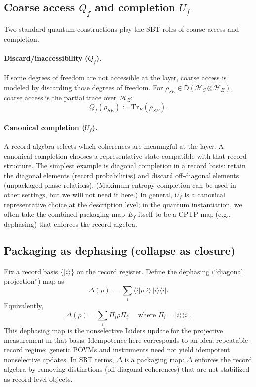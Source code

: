 \subsection{Coarse access $Q_f$ and completion $U_f$}

Two standard quantum constructions play the SBT roles of coarse access and completion.

\paragraph{Discard/inaccessibility ($Q_f$).}
If some degrees of freedom are not accessible at the layer, coarse access is modeled by discarding those degrees of freedom.
For $\rho_{SE}\in \mathsf{D}(\mathcal{H}_S\otimes \mathcal{H}_E)$, coarse access is the partial trace over~$\mathcal{H}_E$:
\[
Q_f(\rho_{SE}) := \mathrm{Tr}_E(\rho_{SE}).
\]

\paragraph{Canonical completion ($U_f$).}
A record algebra selects which coherences are meaningful at the layer.
A canonical completion chooses a representative state compatible with that record structure.
The simplest example is diagonal completion in a record basis: retain the diagonal elements (record probabilities) and discard off-diagonal elements (unpackaged phase relations).
(Maximum-entropy completion can be used in other settings, but we will not need it here.)
In general, $U_f$ is a canonical representative choice at the description level; in the quantum instantiation, we often take the combined packaging map~$E_f$ itself to be a CPTP map (e.g., dephasing) that enforces the record algebra.

\subsection{Packaging as dephasing (collapse as closure)}

Fix a record basis $\{|i\rangle\}$ on the record register.
Define the dephasing (``diagonal projection'') map as
\[
\Delta(\rho) := \sum_i \langle i|\rho|i\rangle\, |i\rangle\!\langle i|.
\]
Equivalently,
\[
\Delta(\rho)=\sum_i \Pi_i \rho \Pi_i,\quad \text{where } \Pi_i = |i\rangle\!\langle i|.
\]
This dephasing map is the nonselective L\"uders update for the projective measurement in that basis.\cite{NielsenChuang2010QCQI} Idempotence here corresponds to an ideal repeatable-record regime; generic POVMs and instruments need not yield idempotent nonselective updates.
In SBT terms, $\Delta$ is a packaging map: $\Delta$ enforces the record algebra by removing distinctions (off-diagonal coherences) that are not stabilized as record-level objects.

